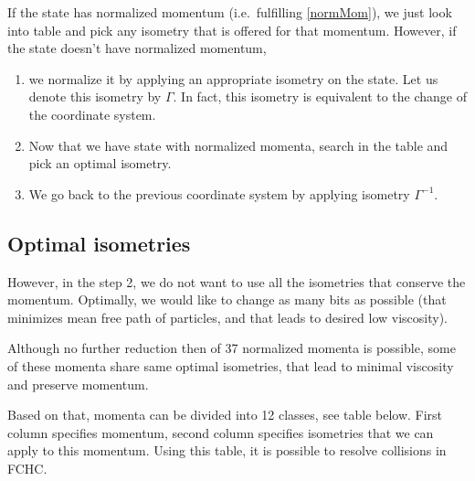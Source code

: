 If the state has normalized momentum (i.e.\ fulfilling \ref{normMom}), we just look into table and pick any isometry that is offered for that momentum. However, if the state doesn't have normalized momentum,
\begin{enumerate}
\item we normalize it by applying an appropriate isometry on the state. Let us denote this isometry by $\Gamma$. In fact, this isometry is equivalent to the change of the coordinate system.

\item Now that we have state with normalized momenta, search in the table and pick an optimal isometry.

\item We go back to the previous coordinate system by applying isometry $\Gamma^{-1}$.
\end{enumerate}

\subsection{Optimal isometries}

However, in the step 2, we do not want to use all the isometries that conserve the momentum.
Optimally, we would like to change as many bits as possible (that minimizes mean free path of particles, and that leads to desired low viscosity).

Although no further reduction then of 37 normalized momenta is possible,
some of these momenta share same optimal isometries, that lead to minimal viscosity and preserve momentum.

Based on that,  momenta can be divided into 12 classes, see table below.
First column specifies momentum, second column specifies isometries that we can apply to this momentum. Using this table, it is possible to resolve collisions in FCHC.

